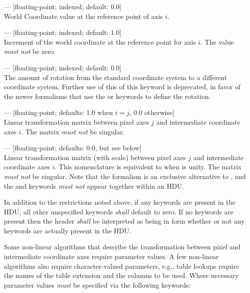 \documentclass[11pt,makeidx]{book}     %
\begin{document}
\begin{description}
\item {} --- [floating-point; indexed; default: 0.0]\\ 
World Coordinate value at the reference point of axis $i$.

\item {} --- [floating-point; indexed; default: 1.0]\\ 
Increment of the world coordinate at the reference point for axis $i$. 
The value {\em must not} be zero.

\item {} --- [floating-point; indexed; default: 0.0]\\
The amount of rotation from the standard coordinate
system to a different coordinate system.  Further use of this of this keyword
is deprecated,  in favor of the newer formalisms that use the
 or  keywords to define the rotation.

\item {}  --- [floating-point; defaults: 1.0 when $i=j$, 0.0
otherwise]\\ 
Linear transformation matrix between pixel axes $j$ and intermediate
coordinate axes $i$. The  matrix {\em must not} be singular. 

\item {}  --- [floating-point; defaults: 0.0, but see below]\\
Linear transformation matrix (with scale) between pixel axes $j$ and intermediate
coordinate axes $i$. This nomenclature is equivalent to  when
 is unity. The  matrix {\em must not} be
singular. Note that the  formalism is an exclusive alternative to
, and the  and   keywords
{\em must not} appear together within an HDU. 

\end{description}

\noindent In addition to the restrictions noted above, if any 
keywords are present in the HDU, all other unspecified  keywords
{\em shall} default to zero. If no  keywords are present then
the header {\em shall} be interpreted as being in  form whether
or not any  keywords are actually present in the HDU.  

Some non-linear algorithms that describe the transformation between pixel and
intermediate coordinate axes require parameter values. A few non-linear algorithms
also require character-valued parameters, e.g., table lookups require the names of
the table extension and the columns to be used. Where necessary parameter values
{\em must} be specified via the following keywords: 
\end{document}
